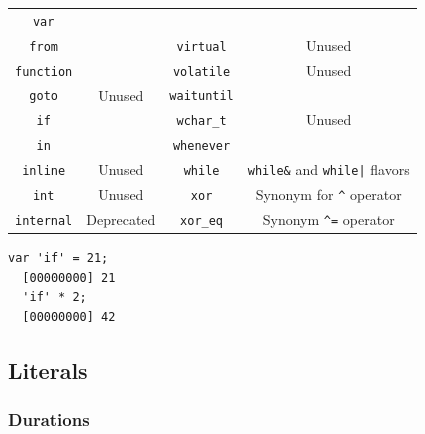 \documentclass[openright,twoside,12pt]{report}
\newcommand   {\floatpos}          {htbp}
\begin{document}
\begin{table}[\floatpos]
\begin{tabular}{|c|c||c|c|}
    \lstinline"var"               &                                         \\
    \lstinline"from"              &                                         &
    \lstinline"virtual"           & Unused                                  \\
    \lstinline"function"          &                                         &
    \lstinline"volatile"          & Unused                                  \\
    \lstinline"goto"              & Unused                                  &
    \lstinline"waituntil"         &                                         \\
    \lstinline"if"                &                                         &
    \lstinline"wchar_t"           & Unused                                  \\
    \lstinline"in"                &                                         &
    \lstinline"whenever"          &                                         \\
    \lstinline"inline"            & Unused                                  &
    \lstinline"while"             & \lstinline|while&| and
                                    \lstinline-while|- flavors              \\
    \lstinline"int"               & Unused                                  &
    \lstinline"xor"               & Synonym for \lstinline|^| operator      \\
    \lstinline"internal"          & Deprecated                              &
    \lstinline"xor_eq"            & Synonym \lstinline|^=| operator         \\
    \hline
  \end{tabular}
\end{table}
\renewcommand{\baselinestretch}{1}

\begin{lstlisting}[caption=Escaping keywords,label=lst:escape-keyword,float=\floatpos]
  var 'if' = 21;
  [00000000] 21
  'if' * 2;
  [00000000] 42
\end{lstlisting}

\subsection{Literals}
\subsubsection{Durations}
\end{document}
